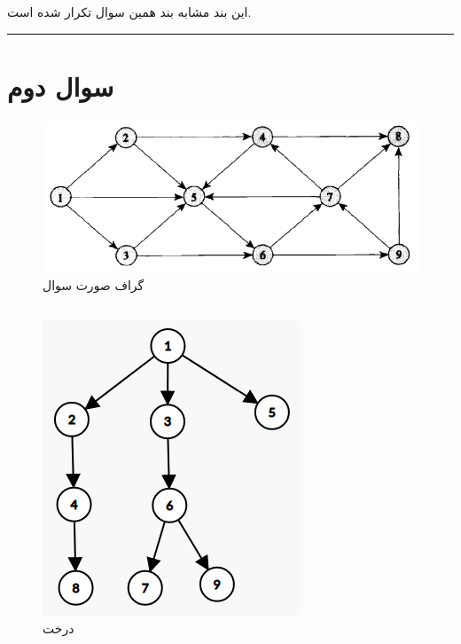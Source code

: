 \documentclass{article}
\begin{document}
\begin{multicols}{2}
\subsection*{}
این بند مشابه بند
همین سوال تکرار شده است.\\
\rule{\linewidth}{1pt}
\section*{سوال دوم}
\begin{figure}[H]
    \center
    \includegraphics[width=0.9\linewidth]{Photos/HW2/2.png}
    \caption{
    گراف صورت سوال
    }
    \label{fig:my_label}
\end{figure}

\subsection*{}
\begin{figure}[H]
    \center
    \includegraphics[width=0.45\linewidth]{Photos/HW2/bfs2.png}
    \caption{
    درخت
    }
    \label{fig:my_label}
\end{figure}


\end{multicols}
\end{document}
